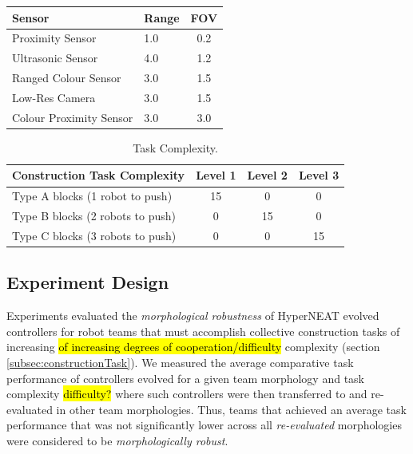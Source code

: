 \begin{table}
\begin{tabular}{llc}
		\hline
		Sensor                                                 & Range     & FOV \\
		\hline
		Proximity Sensor		                               & 	1.0	   &  0.2  \\
		Ultrasonic Sensor		                               &	4.0    &  1.2  \\
		Ranged Colour Sensor	                               &	3.0	   &  1.5 \\
		Low-Res Camera			                               & 	3.0	   &  1.5 \\
		Colour Proximity Sensor                                & 	3.0	   &  3.0 \\
		\hline
	\end{tabular}
\end{table}

\begin{table}[t]
	\renewcommand{\arraystretch}{1.30}
	\caption{Task Complexity.}\label{tab:taskComplexity}
	\centering
	\begin{tabular}{lccc}
		\hline
		Construction Task Complexity                               & Level 1     & Level 2    & Level 3   \\
		\hline
		Type A blocks (1 robot to push)	                           & 	15	     & 0          & 0  \\
		Type B blocks (2 robots to push)		                   &	0 	     & 15         & 0  \\
		Type C blocks (3 robots to push)	                       &  	0	     & 0          & 15  \\
		\hline
	\end{tabular}
\end{table}

\subsection{Experiment Design}\label{subsec:expDesign}

Experiments evaluated the \textit{morphological robustness} of HyperNEAT evolved controllers for
robot teams that must accomplish collective construction tasks of increasing \hl{of increasing degrees of cooperation/difficulty}
complexity (section \ref{subsec:constructionTask}).
We measured the average comparative task performance of controllers evolved
for a given team morphology and task complexity \hl{difficulty?} where such controllers were
then transferred to
and re-evaluated in other team morphologies.
Thus, teams that achieved an average task performance that was not significantly lower
across all \textit{re-evaluated} morphologies were considered to be \textit{morphologically robust}.


